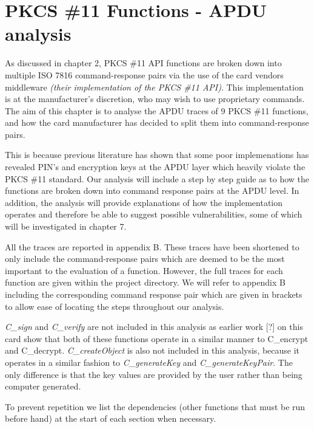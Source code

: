 \documentclass[bsc,frontabs,twoside,singlespacing,parskip,deptreport]{infthesis}     %
\begin{document}

\chapter{PKCS \#11 Functions - APDU analysis}

As discussed in chapter 2, PKCS \#11 API functions are broken down into multiple ISO 7816 command-response pairs via the use of the card vendors middleware \textit{(their implementation of the PKCS \#11 API)}. This implementation is  at the manufacturer's discretion, who may wish to use proprietary commands. The aim of this chapter is to analyse the APDU traces of 9 PKCS \#11 functions, and how the card manufacturer has decided to split them into command-response pairs. 

This is because previous literature has shown that some poor implemenations has revealed PIN's and encryption keys at the APDU layer which heavily violate the PKCS \#11 standard. Our analysis will include a step by step guide as to how the functions are broken down into command response pairs at the APDU level.  In addition, the analysis will provide explanations of how the implementation operates and therefore be able to suggest possible vulnerabilities, some of which will be investigated in chapter 7. 

All the traces are reported in appendix B. These traces have been shortened to only include the command-response pairs which are deemed to be the most important to the evaluation of a function. However, the full traces for each function are given within the project directory. We will refer to appendix B including the corresponding command response pair which are given in brackets to allow ease of locating the steps throughout our analysis.

\textit{C\_sign} and \textit{C\_verify} are not included in this analysis as earlier work [?] on this card show that both of these functions operate in a similar manner to C\_encrypt and C\_decrypt. \textit{C\_createObject} is also not included in this analysis, because it operates in a similar fashion to \textit{C\_generateKey} and \textit{C\_generateKeyPair}. The only difference is that the key values are provided by the user rather than being computer generated.

To prevent repetition we list the dependencies (other functions that must be run before hand) at the start of each section when necessary.
\end{document}
